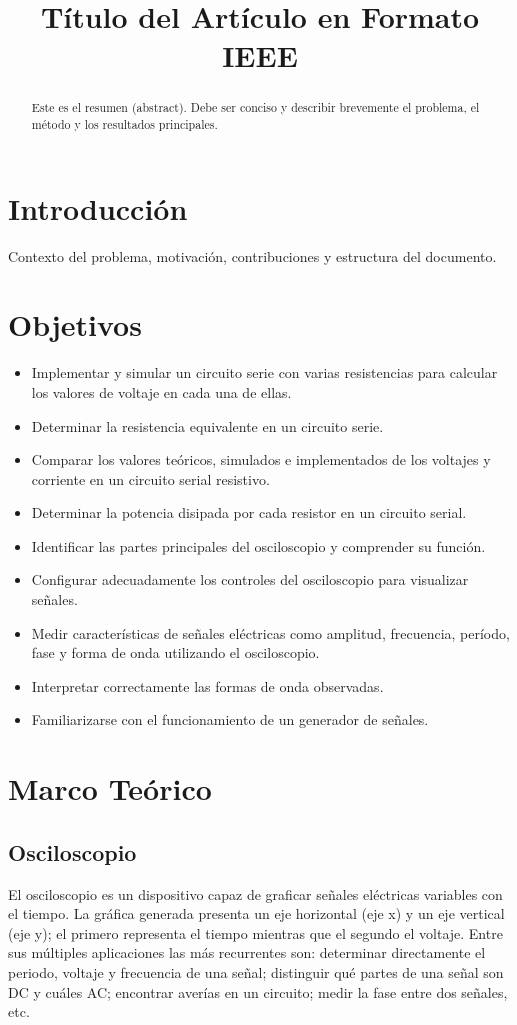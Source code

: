 \documentclass[conference]{IEEEtran} %
\title{Título del Artículo en Formato IEEE}
\author{
\IEEEauthorblockN{Nombre Apellido\IEEEauthorrefmark{1}, Nombre Apellido\IEEEauthorrefmark{2}}
\IEEEauthorblockA{\IEEEauthorrefmark{1}Afiliación 1 \\
Email: autor1@ejemplo.com}
\IEEEauthorblockA{\IEEEauthorrefmark{2}Afiliación 2 \\
Email: autor2@ejemplo.com}
}
\begin{document}
\maketitle

\begin{abstract}
Este es el resumen (abstract). Debe ser conciso y describir brevemente el problema, el método y los resultados principales.
\end{abstract}


\section{Introducción}
Contexto del problema, motivación, contribuciones y estructura del documento.

\section{Objetivos}
\begin{itemize}
  \item Implementar y simular un circuito serie con varias resistencias para calcular los valores de voltaje en cada una de ellas.
  \item Determinar la resistencia equivalente en un circuito serie.
  \item Comparar los valores teóricos, simulados e implementados de los voltajes y corriente en un circuito serial resistivo.
  \item Determinar la potencia disipada por cada resistor en un circuito serial.
  \item Identificar las partes principales del osciloscopio y comprender su función.
  \item Configurar adecuadamente los controles del osciloscopio para visualizar señales.
  \item Medir características de señales eléctricas como amplitud, frecuencia, período, fase y forma de onda utilizando el osciloscopio.
  \item Interpretar correctamente las formas de onda observadas.
  \item Familiarizarse con el funcionamiento de un generador de señales.
\end{itemize}


\section{Marco Teórico}
\subsection{Osciloscopio}
El osciloscopio es un dispositivo capaz de graficar señales eléctricas variables con el tiempo. La gráfica generada presenta un eje horizontal (eje x) y un eje vertical (eje y); el primero representa el tiempo mientras que el segundo el voltaje. Entre sus múltiples aplicaciones las más recurrentes son: determinar directamente el periodo, voltaje y frecuencia de una señal; distinguir qué partes de una señal son DC y cuáles AC; encontrar averías en un circuito; medir la fase entre dos señales, etc.~\cite{ugrOsciloscopio}
\end{document}
